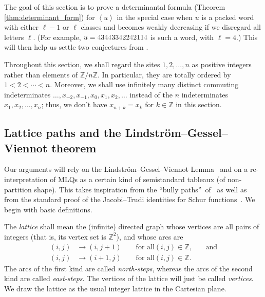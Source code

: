 \documentclass[reqno]{amsart}
\newcommand{\0}{\phantom{c}}
\newcommand{\defn}[1]{{\color{darkred}\emph{#1}}} %
\theoremstyle{plain}
\theoremstyle{definition}
\numberwithin{equation}{section}
\begin{document}
The goal of this section is to prove a determinantal formula (Theorem
\ref{thm:determinant_form}) for $\left\langle u\right\rangle $ in the special
case when $u$ is a packed word with either $\ell-1$ or $\ell$ classes and
becomes weakly decreasing if we disregard all letters $\ell$. (For example,
$u={\color{gray}4}3{\color{gray}44}33{\color{gray}4}22{\color{gray}4}%
211{\color{gray}4}$ is such a word, with $\ell=4$.) This will then help us
settle two conjectures from \cite{AasLin17}.

Throughout this section, we shall regard the sites $1,2,\ldots,n$ as positive
integers rather than elements of $\mathbb{Z}/n\mathbb{Z}$. In particular, they
are totally ordered by $1<2<\cdots<n$. Moreover, we shall use infinitely many
distinct commuting indeterminates $\ldots,x_{-2},x_{-1},x_{0},x_{1}%
,x_{2},\ldots$ instead of the $n$ indeterminates $x_{1},x_{2},\ldots,x_{n}$;
thus, we don't have $x_{n+k}=x_{k}$ for $k\in\mathbb{Z}$ in this section.

\subsection{Lattice paths and the Lindstr\"{o}m--Gessel--Viennot theorem}

Our arguments will rely on the Lindstr\"om--Gessel--Viennot
Lemma~\cite{GV85,Lindstrom73} and on a re-interpretation of MLQs as a certain
kind of semistandard tableaux (of non-partition shape). This takes inspiration
from the \textquotedblleft bully paths\textquotedblright\ of~\cite{AasLin17}
as well as from the standard proof of the Jacobi--Trudi identities for Schur
functions~\cite[First proof of Theorem 7.16.1]{Stanley-EC2}. We begin with
basic definitions.

The \defn{lattice} shall mean the (infinite) directed graph whose vertices are
all pairs of integers (that is, its vertex set is $\mathbb{Z}^{2}$), and whose
arcs are
\begin{align*}
\left(  i,j\right)   &  \rightarrow\left(  i,j+1\right)  \qquad\text{for all
}\left(  i,j\right)  \in\mathbb{Z}\text{,}\qquad\text{and}\\
\left(  i,j\right)   &  \rightarrow\left(  i+1,j\right)  \qquad\text{for all
}\left(  i,j\right)  \in\mathbb{Z}\text{.}%
\end{align*}
The arcs of the first kind are called \defn{north-steps}, whereas the arcs of
the second kind are called \defn{east-steps}. The vertices of the lattice will
just be called \defn{vertices}. We draw the lattice as the usual integer
lattice in the Cartesian plane.
\end{document}
